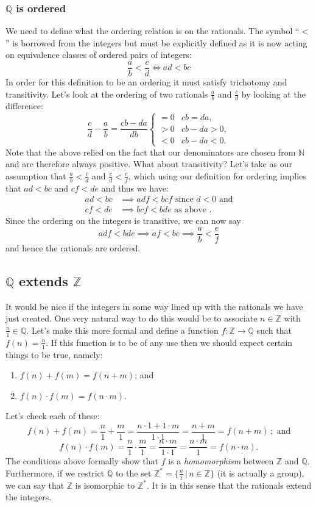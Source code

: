 \documentclass[]{scrartcl}
\theoremstyle{definition}
\newcommand{\bb}[1]{\mathbb{#1}}
\newcommand{\Z}{\bb{Z}}
\newcommand{\Q}{\bb{Q}}
\newcommand{\N}{\bb{N}}
\begin{document}
\subsubsection{$\Q$ is ordered}
We need to define what the ordering relation is on the rationals. The symbol ``$<$'' is borrowed from the integers but must be explicitly defined as it is now acting on equivalence classes of ordered pairs of integers:
$$
\frac{a}{b} < \frac{c}{d} \iff ad<bc
$$
In order for this definition to be an ordering it must satisfy trichotomy and transitivity. Let's look at the ordering of two rationals $\frac{a}{b}$ and $\frac{c}{d}$ by looking at the difference:
$$
\frac{c}{d} - \frac{a}{b} = \frac{cb - da}{db}
\begin{cases}
    = 0 & cb = da, \\
    > 0 & cb - da > 0, \\
    < 0 & cb - da < 0.
\end{cases}
$$
Note that the above relied on the fact that our denominators are chosen from $\N$ and are therefore always positive. What about transitivity? Let's take as our assumption that $\frac{a}{b}<\frac{c}{d}$ and $\frac{c}{d}<\frac{e}{f}$, which using our definition for ordering implies that $ad<bc$ and $cf<de$ and thus we have:
\begin{align*}
    ad < bc &\implies adf < bcf \text{ since }d<0 \text{ and}\\
    cf < de &\implies bcf < bde \text{ as above }.
\end{align*}
Since the ordering on the integers is transitive, we can now say
$$
adf < bde \implies af < be \implies \frac{a}{b} < \frac{e}{f}
$$
and hence the rationals are ordered.

\subsection{$\Q$ extends $\Z$}
It would be nice if the integers in some way lined up with the rationals we have just created. One very natural way to do this would be to associate $n\in\Z$ with $\frac{n}{1} \in \Q$. Let's make this more formal and define a function $f:\Z \rightarrow \Q$ such that $f(n) = \frac{n}{1}$. If this function is to be of any use then we should expect certain things to be true, namely:
\begin{enumerate}
    \item $f(n) + f(m) = f(n+m)$; and
    \item $f(n)\cdot f(m) = f(n\cdot m)$.
\end{enumerate}
Let's check each of these:
$$
f(n) + f(m) = \frac{n}{1} + \frac{m}{1} = \frac{n\cdot 1 + 1\cdot m}{1\cdot1}
= \frac{n+m}{1} = f(n+m)\,; \text{ and}
$$
$$
f(n)\cdot f(m) = \frac{n}{1}\cdot\frac{m}{1} = \frac{n\cdot m}{1\cdot 1}
= \frac{n\cdot m}{1} = f(n\cdot m).
$$
The conditions above formally show that $f$ is a \textit{homomorphism} between $\Z$ and $\Q$. Furthermore, if we restrict $\Q$ to the set $\Z^* = \{\frac{n}{1}\,|\,n\in \Z\}$ (it is actually a group), we can say that $\Z$ is isomorphic to $\Z^*$. It is in this sense that the rationals extend the integers.
\end{document}
